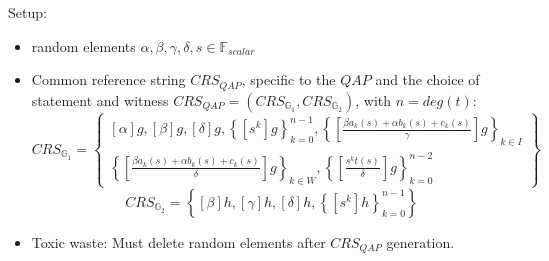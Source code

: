 Setup: 
\begin{itemize}
\item random elements $\alpha,\beta,\gamma, \delta, s \in \mathbb{F}_{scalar}$ 
\item Common reference string $CRS_{QAP}$, specific to the $QAP$ and the choice of statement and witness $CRS_{QAP}= (CRS_{\mathbb{G}_1},CRS_{\mathbb{G}_2})$, with $n=deg(t)$: 
$$
CRS_{\mathbb{G}_{1}}=\left\{ \begin{array}{c}
[\alpha]g,[\beta]g,[\delta]g,\left\{ [s^{k}]g\right\} _{k=0}^{n-1},\left\{ [\frac{\beta a_{k}(s)+\alpha b_{k}(s)+c_{k}(s)}{\gamma}]g\right\} _{k\in I}\\
\left\{ [\frac{\beta a_{k}(s)+\alpha b_{k}(s)+c_{k}(s)}{\delta}]g\right\} _{k\in W},\left\{ [\frac{s^{k}t(s)}{\delta}]g\right\} _{k=0}^{n-2}
\end{array}\right\} 
$$
$$
CRS_{\mathbb{G}_{2}}=\left\{ [\beta]h ,[\gamma]h,[\delta]h,\left\{[s^k]h\right\} _{k=0}^{n-1}\right\} 
$$
\item Toxic waste: Must delete random elements after $CRS_{QAP}$ generation.
\end{itemize} 

